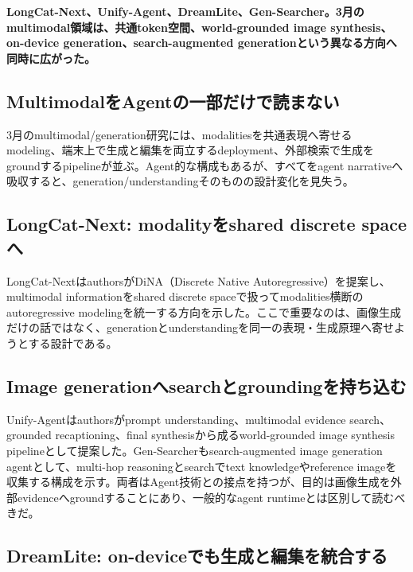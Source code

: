 \noindent\textbf{LongCat-Next、Unify-Agent、DreamLite、Gen-Searcher。3月のmultimodal領域は、共通token空間、world-grounded image synthesis、on-device generation、search-augmented generationという異なる方向へ同時に広がった。}\autocite{src-197775677c0d,src-abece2adf5a7,src-ac36472a8f09,src-b8369fd2c988}

\subsection{MultimodalをAgentの一部だけで読まない}

3月のmultimodal/generation研究には、modalitiesを共通表現へ寄せるmodeling、端末上で生成と編集を両立するdeployment、外部検索で生成をgroundするpipelineが並ぶ。Agent的な構成もあるが、すべてをagent narrativeへ吸収すると、generation/understandingそのものの設計変化を見失う。\autocite{src-197775677c0d,src-abece2adf5a7,src-ac36472a8f09,src-b8369fd2c988}


\subsection{LongCat-Next: modalityをshared discrete spaceへ}

LongCat-NextはauthorsがDiNA（Discrete Native Autoregressive）を提案し、multimodal informationをshared discrete spaceで扱ってmodalities横断のautoregressive modelingを統一する方向を示した。ここで重要なのは、画像生成だけの話ではなく、generationとunderstandingを同一の表現・生成原理へ寄せようとする設計である。\autocite{src-ac36472a8f09}


\subsection{Image generationへsearchとgroundingを持ち込む}

Unify-Agentはauthorsがprompt understanding、multimodal evidence search、grounded recaptioning、final synthesisから成るworld-grounded image synthesis pipelineとして提案した。Gen-Searcherもsearch-augmented image generation agentとして、multi-hop reasoningとsearchでtext knowledgeやreference imageを収集する構成を示す。両者はAgent技術との接点を持つが、目的は画像生成を外部evidenceへgroundすることにあり、一般的なagent runtimeとは区別して読むべきだ。\autocite{src-197775677c0d,src-abece2adf5a7}


\subsection{DreamLite: on-deviceでも生成と編集を統合する}

